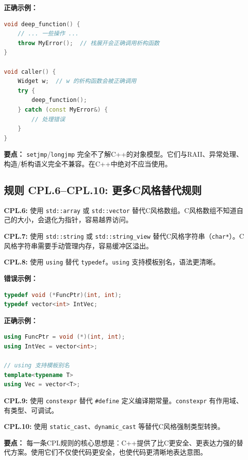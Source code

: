 \textbf{正确示例：}

\begin{lstlisting}[language=C++]
void deep_function() {
    // ... 一些操作 ...
    throw MyError();  // 栈展开会正确调用析构函数
}

void caller() {
    Widget w;  // w 的析构函数会被正确调用
    try {
        deep_function();
    } catch (const MyError&) {
        // 处理错误
    }
}
\end{lstlisting}

\textbf{要点：} \texttt{setjmp}/\allowbreak{}\texttt{longjmp} 完全不了解C++的对象模型。它们与RAII、异常处理、构造/析构语义完全不兼容。在C++中绝对不应当使用。

\subsection*{\textbf{规则 CPL.6--CPL.10:} 更多C风格替代规则}

\textbf{CPL.6:} 使用 \texttt{std::array} 或 \texttt{std::vector} 替代C风格数组。C风格数组不知道自己的大小，会退化为指针，容易越界访问。

\textbf{CPL.7:} 使用 \texttt{std::string} 或 \texttt{std::string\_view} 替代C风格字符串（\texttt{char*}）。C风格字符串需要手动管理内存，容易缓冲区溢出。

\textbf{CPL.8:} 使用 \texttt{using} 替代 \texttt{typedef}。\texttt{using} 支持模板别名，语法更清晰。

\textbf{错误示例：}

\begin{lstlisting}[language=C++]
typedef void (*FuncPtr)(int, int);
typedef vector<int> IntVec;
\end{lstlisting}

\textbf{正确示例：}

\begin{lstlisting}[language=C++]
using FuncPtr = void (*)(int, int);
using IntVec = vector<int>;

// using 支持模板别名
template<typename T>
using Vec = vector<T>;
\end{lstlisting}

\textbf{CPL.9:} 使用 \texttt{constexpr} 替代 \texttt{\#define} 定义编译期常量。\texttt{constexpr} 有作用域、有类型、可调试。

\textbf{CPL.10:} 使用 \texttt{static\_cast}、\texttt{dynamic\_cast} 等替代C风格强制类型转换。

\textbf{要点：} 每一条CPL规则的核心思想是：C++提供了比C更安全、更表达力强的替代方案。使用它们不仅使代码更安全，也使代码更清晰地表达意图。

